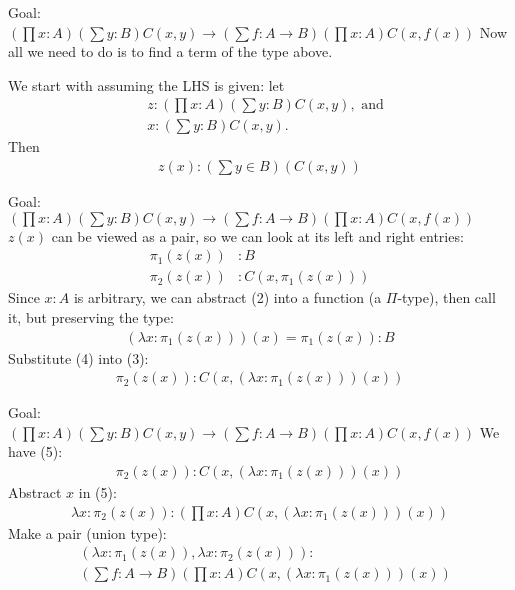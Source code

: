 \documentclass{beamer}
\theoremstyle{plain}
\begin{document}
\begin{frame}{Goal: $(\prod x: A)(\sum {y: B})C(x, y)\to(\sum{f: A\to B})(\prod{x: A})C(x, f(x))$}
    Now all we need to do is to find a term of the type above.

    We start with assuming the LHS is given: let
    \begin{align*}
    &z:(\prod x: A)(\sum {y: B})C(x, y),\text{ and}\\
    &x:(\sum {y: B})C(x, y).
    \end{align*}
    Then
    \begin{align}
    z(x): (\sum y\in B)(C(x, y))
    \end{align}
\end{frame}

\begin{frame}{Goal: $(\prod x: A)(\sum {y: B})C(x, y)\to(\sum{f: A\to B})(\prod{x: A})C(x, f(x))$}
  $z(x)$ can be viewed as a pair, so we can look at its left and right entries:
    \begin{align}
    \pi_{1}(z(x))&: B\\
    \pi_{2}(z(x))&:C(x, \pi_{1}(z(x)))
    \end{align}
    Since $x: A$ is arbitrary, we can abstract (2) into a function (a $\Pi$-type),
    then call it, but preserving the type:
    \begin{align}
    (\lambda x:\pi_{1}(z(x)))(x) = \pi_{1}(z(x)): B
    \end{align}
    Substitute (4) into (3):
    \begin{align}
    \pi_{2}(z(x)):C(x, (\lambda x:\pi_{1}(z(x)))(x))
    \end{align}
\end{frame}

\begin{frame}{Goal: $(\prod x: A)(\sum {y: B})C(x, y)\to(\sum{f: A\to B})(\prod{x: A})C(x, f(x))$}
  We have (5):
  \begin{align*}
    \pi_{2}(z(x)):C(x, (\lambda x:\pi_{1}(z(x)))(x))
  \end{align*}
    Abstract $x$ in (5):
    \begin{align}
    \lambda x:\pi_{2}(z(x)):(\prod x:A)C(x, (\lambda x:\pi_{1}(z(x)))(x))
    \end{align}
    Make a pair (union type):
      \begin{align}
        &(\lambda x: \pi_{1}(z(x)), \lambda x:\pi_{2}(z(x))):\nonumber\\
        &(\sum f:A\to B)(\prod x:A)C(x, (\lambda x:\pi_{1}(z(x)))(x))
      \end{align}
\end{frame}
\end{document}
